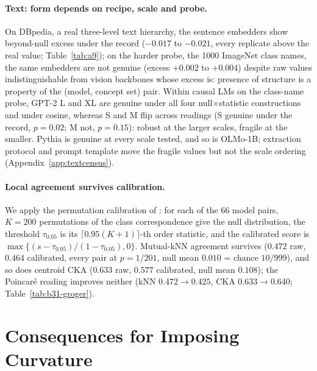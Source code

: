 \paragraph{Text: form depends on recipe, scale and probe.} On DBpedia, a real three-level text hierarchy, the sentence embedders show beyond-null excess under the record ($-0.017$ to $-0.021$, every replicate above the real value; Table~\ref{tab:a9}); on the harder probe, the 1000 ImageNet class names, the same embedders are not genuine (excess $+0.002$ to $+0.004$) despite raw values indistinguishable from vision backbones whose excess is: presence of structure is a property of the (model, concept set) pair. Within causal LMs on the class-name probe, GPT-2 L and XL are genuine under all four null$\times$statistic constructions and under cosine, whereas S and M flip across readings (S genuine under the record, $p=0.02$; M not, $p=0.15$): robust at the larger scales, fragile at the smaller. Pythia is genuine at every scale tested, and so is OLMo-1B; extraction protocol and prompt template move the fragile values but not the scale ordering (Appendix~\ref{app:textcensus}). %

\paragraph{Local agreement survives calibration.} We apply the permutation calibration of \citet{groger2026aristotelian}: for each of the 66 model pairs, $K{=}200$ permutations of the class correspondence give the null distribution, the threshold $\tau_{0.05}$ is its $\lceil 0.95(K{+}1)\rceil$-th order statistic, and the calibrated score is $\max\{(s-\tau_{0.05})/(1-\tau_{0.05}),0\}$. Mutual-kNN agreement survives ($0.472$ raw, $0.464$ calibrated, every pair at $p=1/201$, null mean $0.010$ = chance $10/999$), and so does centroid CKA ($0.633$ raw, $0.577$ calibrated, null mean $0.108$); the Poincar\'{e} reading improves neither (kNN $0.472\to0.425$, CKA $0.633\to0.640$; Table~\ref{tab:b31-groger}). %

\section{Consequences for Imposing Curvature}
\label{sec:practice}

